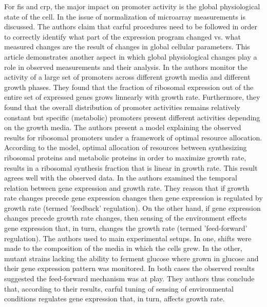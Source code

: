 \documentclass{report}
\begin{document}
For fis and crp, the major impact on promoter activity is the global physiological state of the cell.
In \cite{loven2012} the issue of normalization of microarray measurements is discussed.
The authors claim that carful procedures need to be followed in order to correctly identify what part of the expression program changed vs. what measured changes are the result of changes in global cellular parameters.
This article demonstrates another aspect in which global physiological changes play a role in observed measurements and their analysis.
In \cite{Zaslaver2009a} the authors monitor the activity of a large set of promoters across different growth media and different growth phases.
They found that the fraction of ribosomal expression out of the entire set of expressed genes grows linnearly with growth rate.
Furthermore, they found that the overall distribution of promoter activities remains relatively constant but specific (metabolic) promoters present different activities depending on the growth media.
The authors present a model explaining the observed results for ribosomal promoters under a framework of optimal resource allocation.
According to the model, optimal allocation of resources between synthesizing ribosomal proteins and metabolic proteins in order to maximize growth rate, results in a ribosomal synthesis fraction that is linear in growth rate.
This result agrees well with the observed data.
In \cite{Levy2009} the authors examined the temporal relation between gene expression and growth rate.
They reason that if growth rate changes precede gene expression changes then gene expression is regulated by growth rate (termed 'feedback' regulation).
On the other hand, if gene expression changes precede growth rate changes, then sensing of the environment effects gene expression that, in turn, changes the growth rate (termed 'feed-forward' regulation).
The authors used to main experimental setups.
In one, shifts were made to the composition of the media in which the cells grew.
In the other, mutant strains lacking the ability to ferment glucose where grown in glucose and their gene expression pattern was monitored.
In both cases the observed results suggested the feed-forward mechanism was at play.
They authors thus conclude that, according to their results, carful tuning of sensing of environmental conditions regulates gene expression that, in turn, affects growth rate.
\end{document}
